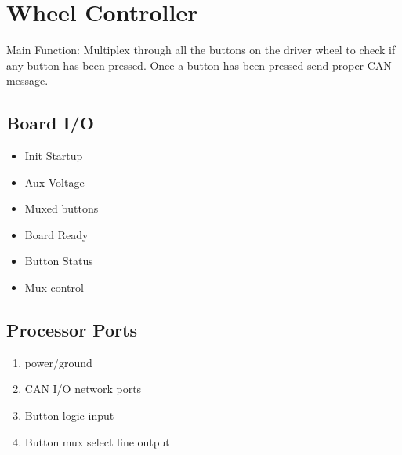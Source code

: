 \documentclass[letterpaper,12pt]{article}
\begin{document}
\pagebreak
\section{Wheel Controller}
Main Function: Multiplex through all the buttons on the driver wheel to check if any button has been pressed. Once a button has been pressed send proper CAN message.
   \subsection{Board I/O}
   \begin{multicols}{2}
   
   \begin{itemize}
      \item Init Startup
   \end{itemize}
   
   \begin{itemize}
      \item Aux Voltage
      \item Muxed buttons
   \end{itemize}
   
   \columnbreak
   

   \begin{itemize}
      \item Board Ready
      \item Button Status
   \end{itemize}
   
   \begin{itemize}
      \item Mux control
   \end{itemize}
   \end{multicols}

   \subsection{Processor Ports}
   \begin{multicols}{2}
   \begin{enumerate}[(a.)]
      \item power/ground
      \item CAN I/O network ports
      \item Button logic input

      \item Button mux select line output
   \end{enumerate}
   \end{multicols}


\pagebreak
\end{document}
